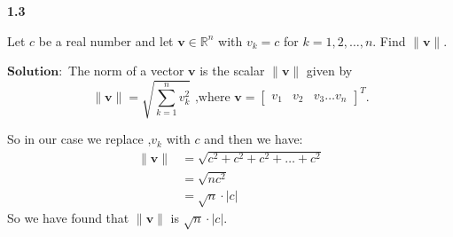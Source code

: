 \documentclass[12pt]{article}
\begin{document}
    
    \textbf{1.3}  
    
        Let $c$ be a real number and let $\mathbf{v} \in \mathbb{R}^n$ with $v_k = c$ for $k = 1,2, \dots ,n.$ Find $\|\mathbf{v}\|$.
    
    
        
            $\textbf{Solution}:$ The norm of a vector $\mathbf{v}$ is the scalar $\|  \mathbf{v} \|$ given by   
            $$\|  \mathbf{v} \| = \sqrt{\sum_{k=1}^{n}v_k^2} \text{ ,where } \mathbf{v} = \begin{bmatrix}v_1  &v_2& v_3 \dots v_n
               \end{bmatrix}^{T}.  $$
            
            So in our case we replace ,$v_k$ with $c$ and then we have:
            \begin{align*}
                \|  \mathbf{v} \|& = \sqrt{c^2 + c^2 + c^2 + \dots +c^2}\\
                & = \sqrt{nc^2}\\
                & = \sqrt{n} \cdot \lvert c\rvert
            \end{align*}
            So we have found that $\|\mathbf{v}\|$ is $\sqrt{n} \cdot \lvert c\rvert$.
\end{document}
